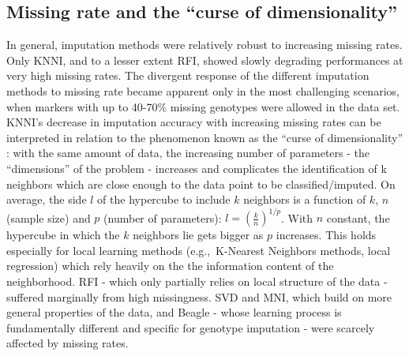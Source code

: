 \subsection{Missing rate and the ``curse of dimensionality''}
\label{sec:missing_rate_curse_dimensionality}
In general, imputation methods were relatively robust to increasing missing rates. Only KNNI, and to a lesser extent RFI, showed slowly degrading performances at very high missing rates. The divergent response of the different imputation methods to missing rate became apparent only in the most challenging scenarios, when markers with up to 40-70\% missing genotypes were allowed in the data set.\\
KNNI's decrease in imputation accuracy with increasing missing rates can be interpreted in relation to the phenomenon known as the ``curse of dimensionality'' \cite{bellman_dynamic_1957,marimont_nearest_1979}: with the same amount of data, the increasing number of parameters - the ``dimensions'' of the problem - increases and complicates the identification of k neighbors which are close enough to the data point to be classified/imputed. 
On average, the side $l$ of the hypercube to include $k$ neighbors is a function of $k$, $n$ (sample size) and $p$ (number of parameters): $l = \left ( \frac{k}{n} \right )^{1/p}$. With $n$ constant, the hypercube in which the $k$ neighbors lie gets bigger as $p$ increases. This holds especially for local learning methods (e.g.,~K-Nearest Neighbors methods, local regression) which rely heavily on the the information content of the neighborhood. RFI - which only partially relies on local structure of the data - suffered marginally from high missingness. SVD and MNI, which build on more general properties of the data, and Beagle - whose learning process is fundamentally different and specific for genotype imputation - were scarcely affected by missing rates.

